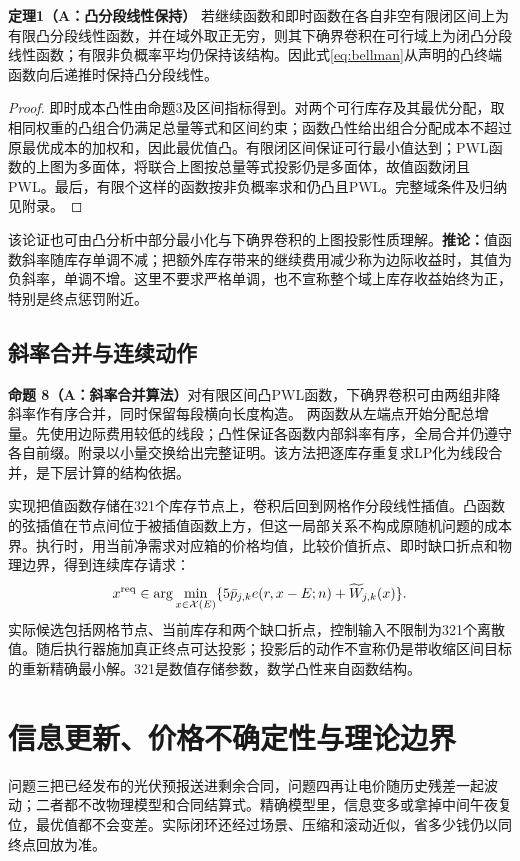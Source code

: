 \documentclass[UTF8,a4paper,zihao=-4,fontset=mac]{ctexart}
\newcommand{\pp}[2]{\par\noindent\textbf{命题 #1（#2）}\quad}
\begin{document}
\noindent\textbf{定理1（A：凸分段线性保持）}\quad
若继续函数和即时函数在各自非空有限闭区间上为有限凸分段线性函数，并在域外取正无穷，则其下确界卷积在可行域上为闭凸分段线性函数；有限非负概率平均仍保持该结构。因此式\eqref{eq:bellman}从声明的凸终端函数向后递推时保持凸分段线性。
\begin{proof}
即时成本凸性由命题3及区间指标得到。对两个可行库存及其最优分配，取相同权重的凸组合仍满足总量等式和区间约束；函数凸性给出组合分配成本不超过原最优成本的加权和，因此最优值凸。有限闭区间保证可行最小值达到；PWL函数的上图为多面体，将联合上图按总量等式投影仍是多面体，故值函数闭且PWL。最后，有限个这样的函数按非负概率求和仍凸且PWL。完整域条件及归纳见附录。
\end{proof}
该论证也可由凸分析中部分最小化与下确界卷积的上图投影性质理解\cite{rockafellar,boyd}。\textbf{推论：}值函数斜率随库存单调不减；把额外库存带来的继续费用减少称为边际收益时，其值为负斜率，单调不增。这里不要求严格单调，也不宣称整个域上库存收益始终为正，特别是终点惩罚附近。

\subsection{斜率合并与连续动作}
\pp{8}{A：斜率合并算法}对有限区间凸PWL函数，下确界卷积可由两组非降斜率作有序合并，同时保留每段横向长度构造。
两函数从左端点开始分配总增量。先使用边际费用较低的线段；凸性保证各函数内部斜率有序，全局合并仍遵守各自前缀。附录以小量交换给出完整证明。该方法把逐库存重复求LP化为线段合并，是下层计算的结构依据。

实现把值函数存储在321个库存节点上，卷积后回到网格作分段线性插值。凸函数的弦插值在节点间位于被插值函数上方，但这一局部关系不构成原随机问题的成本界。执行时，用当前净需求对应箱的价格均值，比较价值折点、即时缺口折点和物理边界，得到连续库存请求：
\begin{equation}\label{eq:action}
 x^{\rm req}\in\arg\min_{x\in\mathcal X(E)}
 \{5\bar p_{j,k}e(r,x-E;n)+\widetilde W_{j,k}(x)\}.
\end{equation}
实际候选包括网格节点、当前库存和两个缺口折点，控制输入不限制为321个离散值。随后执行器施加真正终点可达投影；投影后的动作不宣称仍是带收缩区间目标的重新精确最小解。321是数值存储参数，数学凸性来自函数结构。

\section{信息更新、价格不确定性与理论边界}
问题三把已经发布的光伏预报送进剩余合同，问题四再让电价随历史残差一起波动；二者都不改物理模型和合同结算式。精确模型里，信息变多或拿掉中间午夜复位，最优值都不会变差。实际闭环还经过场景、压缩和滚动近似，省多少钱仍以同终点回放为准。
\end{document}
